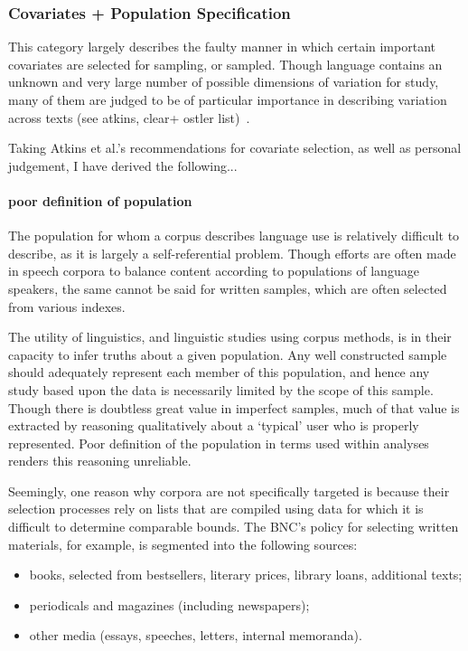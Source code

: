 \subsubsection{Covariates + Population Specification}
This category largely describes the faulty manner in which certain important covariates are selected for sampling, or sampled. Though language contains an unknown and very large number of possible dimensions of variation for study, many of them are judged to be of particular importance in describing variation across texts (see atkins, clear+ ostler list)~\cite{atkins1992corpus}.

Taking Atkins et al.'s recommendations for covariate selection, as well as personal judgement, I have derived the following...






\paragraph{ poor definition of population}
The population for whom a corpus describes language use is relatively difficult to describe, as it is largely a self-referential problem. Though efforts are often made in speech corpora to balance content according to populations of language speakers, the same cannot be said for written samples, which are often selected from various indexes.

The utility of linguistics, and linguistic studies using corpus methods, is in their capacity to infer truths about a given population. Any well constructed sample should adequately represent each member of this population, and hence any study based upon the data is necessarily limited by the scope of this sample. Though there is doubtless great value in imperfect samples, much of that value is extracted by reasoning qualitatively about a `typical' user who is properly represented. Poor definition of the population in terms used within analyses renders this reasoning unreliable.

Seemingly, one reason why corpora are not specifically targeted is because their selection processes rely on lists that are compiled using data for which it is difficult to determine comparable bounds.  The BNC's policy for selecting written materials, for example, is segmented into the following sources:

\begin{itemize}
 \item books, selected from bestsellers, literary prices, library loans, additional texts;
 \item periodicals and magazines (including newspapers);
 \item other media (essays, speeches, letters, internal memoranda).
\end{itemize}

